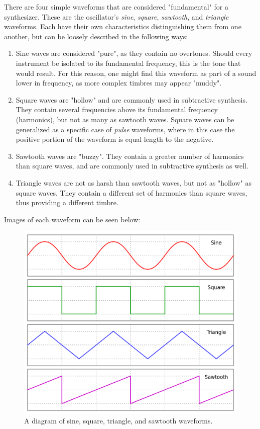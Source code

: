 \documentclass[12pt]{article}
\begin{document}
There are four simple waveforms that are considered "fundamental" for a synthesizer. These are the oscillator's \textit{sine}, \textit{square}, \textit{sawtooth}, and \textit{triangle} waveforms. Each have their own characteristics distinguishing them from one another, but can be loosely described in the following ways:

\begin{enumerate}
	\item Sine waves are considered "pure", as they contain no overtones. Should every instrument be isolated to its fundamental frequency, this is the tone that would result. For this reason, one might find this waveform as part of a sound lower in frequency, as more complex timbres may appear "muddy".
	\item Square waves are "hollow" and are commonly used in subtractive synthesis. They contain several frequencies above its fundamental frequency (harmonics), but not as many as sawtooth waves. Square waves can be generalized as a specific case of \textit{pulse} waveforms, where in this case the positive portion of the waveform is equal length to the negative.
	\item Sawtooth waves are "buzzy". They contain a greater number of harmonics than square waves, and are commonly used in subtractive synthesis as well.
	\item Triangle waves are not as harsh than sawtooth waves, but not as "hollow" as square waves. They contain a different set of harmonics than square waves, thus providing a different timbre.
\end{enumerate}

Images of each waveform can be seen below:

\begin{figure}[h]
	\centering
	\includegraphics[scale=0.25]{Waveforms.png}
	\caption{A diagram of sine, square, triangle, and sawtooth waveforms.}
\end{figure}
\end{document}
